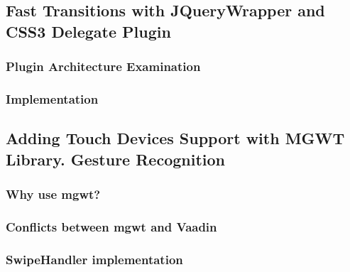 \subsection{Fast Transitions with JQueryWrapper and CSS3 Delegate Plugin}
\subsubsection{Plugin Architecture Examination}
\subsubsection{Implementation}

\subsection{Adding Touch Devices Support with MGWT Library. Gesture Recognition}
\subsubsection{Why use mgwt?}
\subsubsection{Conflicts between mgwt and Vaadin}
\subsubsection{SwipeHandler implementation}
